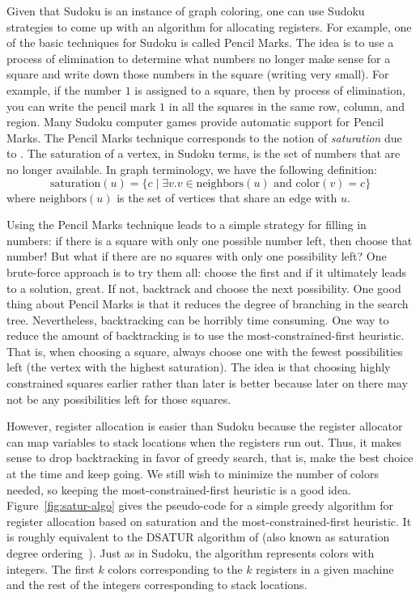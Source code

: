 \documentclass[11pt]{book}
\begin{document}
Given that Sudoku is an instance of graph coloring, one can use Sudoku
strategies to come up with an algorithm for allocating registers. For
example, one of the basic techniques for Sudoku is called Pencil
Marks. The idea is to use a process of elimination to determine what
numbers no longer make sense for a square and write down those
numbers in the square (writing very small). For example, if the number
$1$ is assigned to a square, then by process of elimination, you can
write the pencil mark $1$ in all the squares in the same row, column,
and region. Many Sudoku computer games provide automatic support for
Pencil Marks.
%
The Pencil Marks technique corresponds to the notion of
\emph{saturation} due to \cite{Brelaz:1979eu}.  The saturation of a
vertex, in Sudoku terms, is the set of numbers that are no longer
available. In graph terminology, we have the following definition:
\begin{equation*}
  \mathrm{saturation}(u) = \{ c \;|\; \exists v. v \in \mathrm{neighbors}(u)
     \text{ and } \mathrm{color}(v) = c \}
\end{equation*}
where $\mathrm{neighbors}(u)$ is the set of vertices that share an
edge with $u$.

Using the Pencil Marks technique leads to a simple strategy for
filling in numbers: if there is a square with only one possible number
left, then choose that number! But what if there are no squares with
only one possibility left? One brute-force approach is to try them
all: choose the first  and if it ultimately leads to a solution,
great.  If not, backtrack and choose the next possibility.  One good
thing about Pencil Marks is that it reduces the degree of branching in
the search tree. Nevertheless, backtracking can be horribly time
consuming. One way to reduce the amount of backtracking is to use the
most-constrained-first heuristic. That is, when choosing a square,
always choose one with the fewest possibilities left (the vertex with
the highest saturation).  The idea is that choosing highly constrained
squares earlier rather than later is better because later on there may
not be any possibilities left for those squares.

However, register allocation is easier than Sudoku because the
register allocator can map variables to stack locations when the
registers run out. Thus, it makes sense to drop backtracking in favor
of greedy search, that is, make the best choice at the time and keep
going. We still wish to minimize the number of colors needed, so
keeping the most-constrained-first heuristic is a good idea.
Figure~\ref{fig:satur-algo} gives the pseudo-code for a simple greedy
algorithm for register allocation based on saturation and the
most-constrained-first heuristic. It is roughly equivalent to the
DSATUR algorithm of \cite{Brelaz:1979eu} (also known as saturation
degree ordering~\citep{Gebremedhin:1999fk,Omari:2006uq}).  Just as in
Sudoku, the algorithm represents colors with integers. The first $k$
colors corresponding to the $k$ registers in a given machine and the
rest of the integers corresponding to stack locations.
\end{document}
